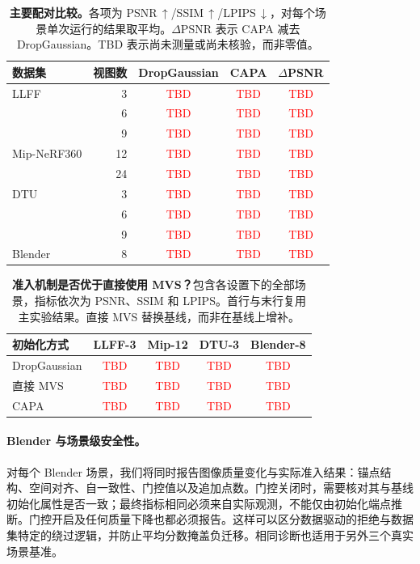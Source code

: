 \documentclass{article}
\newcommand{\ours}{CAPA}
\newcommand{\PH}[1]{\textcolor{red}{#1}}
\newcommand{\pending}{\PH{\textnormal{TBD}}}
\newcommand{\triplet}{\pending}
\begin{document}
\begin{table}[t]
\caption{\textbf{主要配对比较。}各项为 PSNR$\,\uparrow$/SSIM$\,\uparrow$/LPIPS$\,\downarrow$，对每个场景单次运行的结果取平均。$\Delta$PSNR 表示 \ours{} 减去 DropGaussian。TBD 表示尚未测量或尚未核验，而非零值。}
\label{tab:main}
\centering\small
\setlength{\tabcolsep}{6pt}
\begin{tabular}{@{}lrccc@{}}
\toprule
数据集 & 视图数 & DropGaussian & \ours{} & $\Delta$PSNR\\
\midrule
LLFF & 3 & \triplet & \triplet & \pending\\
 & 6 & \triplet & \triplet & \pending\\
 & 9 & \triplet & \triplet & \pending\\
Mip-NeRF360 & 12 & \triplet & \triplet & \pending\\
 & 24 & \triplet & \triplet & \pending\\
DTU & 3 & \triplet & \triplet & \pending\\
 & 6 & \triplet & \triplet & \pending\\
 & 9 & \triplet & \triplet & \pending\\
Blender & 8 & \triplet & \triplet & \pending\\
\bottomrule
\end{tabular}
\end{table}

\begin{table}[t]
\caption{\textbf{准入机制是否优于直接使用 MVS？}包含各设置下的全部场景，指标依次为 PSNR、SSIM 和 LPIPS。首行与末行复用主实验结果。直接 MVS 替换基线，而非在基线上增补。}
\label{tab:mvs}
\centering\small
\begin{tabular}{@{}lcccc@{}}
\toprule
初始化方式 & LLFF-3 & Mip-12 & DTU-3 & Blender-8\\
\midrule
DropGaussian & \triplet & \triplet & \triplet & \triplet\\
直接 MVS & \triplet & \triplet & \triplet & \triplet\\
\ours{} & \triplet & \triplet & \triplet & \triplet\\
\bottomrule
\end{tabular}
\end{table}

\paragraph{Blender 与场景级安全性。}
对每个 Blender 场景，我们将同时报告图像质量变化与实际准入结果：锚点结构、空间对齐、自一致性、门控值以及追加点数。门控关闭时，需要核对其与基线初始化属性是否一致；最终指标相同必须来自实际观测，不能仅由初始化端点推断。门控开启及任何质量下降也都必须报告。这样可以区分数据驱动的拒绝与数据集特定的绕过逻辑，并防止平均分数掩盖负迁移。相同诊断也适用于另外三个真实场景基准。
\end{document}
